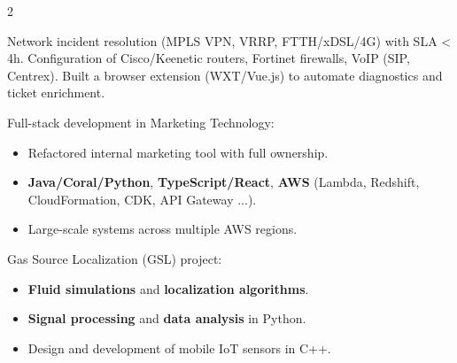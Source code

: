 \documentclass[10pt,a4paper,ragged2e,withhyper]{../AltaCV/altacv}
\begin{document}



\makecvheader


\begin{paracol}{2}


	Network incident resolution (MPLS VPN, VRRP, FTTH/xDSL/4G) with SLA < 4h. Configuration of Cisco/Keenetic routers, Fortinet firewalls, VoIP (SIP, Centrex). Built a browser extension (WXT/Vue.js) to automate diagnostics and ticket enrichment.

	\divider

	Full-stack development in Marketing Technology:

	\begin{itemize}
		\item Refactored internal marketing tool with full ownership.
		\item \textbf{Java/Coral/Python}, \textbf{TypeScript/React}, \textbf{AWS} (Lambda, Redshift, CloudFormation, CDK, API Gateway ...).
		\item Large-scale systems across multiple AWS regions.
	\end{itemize}

	\divider

	Gas Source Localization (GSL) project:
	\begin{itemize}
		\item \textbf{Fluid simulations} and \textbf{localization algorithms}.
		\item \textbf{Signal processing} and \textbf{data analysis} in Python.
		\item Design and development of mobile IoT sensors in C++.
	\end{itemize}


\end{paracol}
\end{document}

